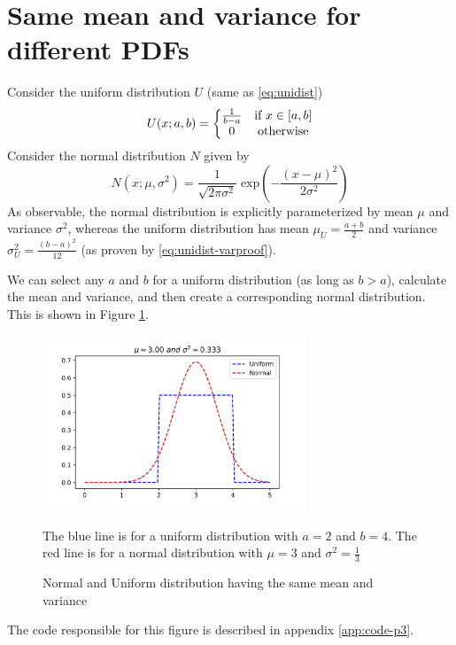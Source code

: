 \documentclass[main.tex]{article}
\begin{document}
    \section[P3: Same \texorpdfstring{$\mu$}{mean} and \texorpdfstring{$\sigma^2$}{variance}]{Same mean and variance for different PDFs}
    Consider the uniform distribution $U$ (same as \ref{eq:unidist})
    \begin{equation}
        U(x;a,b) = \left\{\begin{matrix}
        \frac{1}{b-a} & \textup{if } x \in [a,b] \\
        0 & \textup{otherwise}
        \end{matrix}\right.
    \end{equation}
    Consider the normal distribution $N$ given by
    \begin{equation}
        \label{eq:normal}
        N(x; \mu, \sigma^2) = \frac{1}{\sqrt{2\pi \sigma^2}} \; \mathrm{exp} \left( -\frac{(x-\mu)^2}{2\sigma^2} \right )
    \end{equation}
    As observable, the normal distribution is explicitly parameterized by mean $\mu$ and variance $\sigma^2$, whereas the uniform distribution has mean $\mu_U = \frac{a+b}{2}$ and variance $\sigma_U^2 = \frac{(b-a)^2}{12}$ (as proven by \ref{eq:unidist-varproof}). \par
    We can select any $a$ and $b$ for a uniform distribution (as long as $b>a$), calculate the mean and variance, and then create a corresponding normal distribution. This is shown in Figure \ref{fig:sm-mean-var}.
    \begin{figure}[h]
        \centering
        \includegraphics[width=0.7\textwidth]{plot_p3.png} \\
        \caption[Two PDFs with same \texorpdfstring{$\mu$}{mean} and \texorpdfstring{$\sigma^2$}{variance}]{Normal and Uniform distribution having the same mean and variance}
        \small The blue line is for a uniform distribution with $a=2$ and $b=4$. The red line is for a normal distribution with $\mu=3$ and $\sigma^2 = \frac{1}{3}$
        \label{fig:sm-mean-var}
    \end{figure}
    The code responsible for this figure is described in appendix \ref{app:code-p3}.
\end{document}
